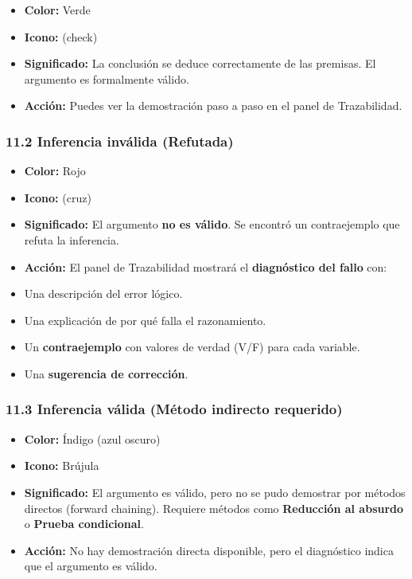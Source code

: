 \documentclass[11pt,a4paper]{article}
\begin{document}
\begin{itemize}[leftmargin=*]
\item \textbf{Color:} Verde
\item \textbf{Icono:}  (check)
\item \textbf{Significado:} La conclusión se deduce correctamente de las premisas. El argumento es formalmente válido.
\item \textbf{Acción:} Puedes ver la demostración paso a paso en el panel de Trazabilidad.
\end{itemize}

\subsubsection{11.2 Inferencia inválida (Refutada)}

\begin{itemize}[leftmargin=*]
\item \textbf{Color:} Rojo
\item \textbf{Icono:}  (cruz)
\item \textbf{Significado:} El argumento \textbf{no es válido}. Se encontró un contraejemplo que refuta la inferencia.
\item \textbf{Acción:} El panel de Trazabilidad mostrará el \textbf{diagnóstico del fallo} con:
\item Una descripción del error lógico.
\item Una explicación de por qué falla el razonamiento.
\item Un \textbf{contraejemplo} con valores de verdad (V/F) para cada variable.
\item Una \textbf{sugerencia de corrección}.
\end{itemize}

\subsubsection{11.3 Inferencia válida (Método indirecto requerido)}

\begin{itemize}[leftmargin=*]
\item \textbf{Color:} Índigo (azul oscuro)
\item \textbf{Icono:} Brújula
\item \textbf{Significado:} El argumento es válido, pero no se pudo demostrar por métodos directos (forward chaining). Requiere métodos como \textbf{Reducción al absurdo} o \textbf{Prueba condicional}.
\item \textbf{Acción:} No hay demostración directa disponible, pero el diagnóstico indica que el argumento es válido.
\end{itemize}
\end{document}
